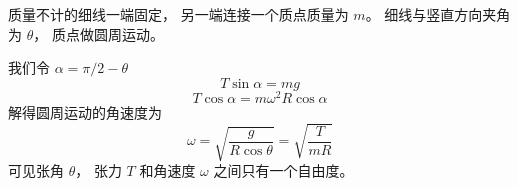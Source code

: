 
\begin{issues}
\issueDraft
\end{issues}



质量不计的细线一端固定， 另一端连接一个质点质量为 $m$。 细线与竖直方向夹角为 $\theta$， 质点做圆周运动。

我们令 $\alpha = \pi/2 - \theta$
\begin{equation}
T\sin\alpha = mg
\end{equation}
\begin{equation}
T\cos\alpha = m\omega^2 R\cos\alpha
\end{equation}
解得圆周运动的角速度为
\begin{equation}
\omega = \sqrt{\frac{g}{R\cos\theta}} = \sqrt{\frac{T}{mR}}
\end{equation}
可见张角 $\theta$， 张力 $T$ 和角速度 $\omega$ 之间只有一个自由度。
